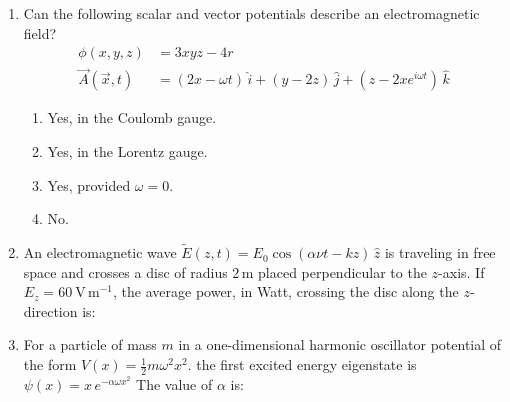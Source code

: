 \documentclass[journal,12pt,onecolumn]{IEEEtran}
\begin{document}
\begin{enumerate}[itemsep = 1em]
\hfill{}

\begin{enumerate}
\end{enumerate}

\item Can the following scalar and vector potentials describe an electromagnetic field?
\begin{align}
\phi(x,y,z) &= 3xyz - 4r \\
\vec{A}(\vec{x},t)  &= (2x - \omega t) \, \hat{i} + (y - 2z) \, \hat{j} + (z-2xe^{i\omega t}) \, \hat{k}  
\end{align}

\hfill{}

\begin{enumerate}
\item Yes, in the Coulomb gauge.
\item Yes, in the Lorentz gauge.
\item Yes, provided $\omega = 0$.
\item No.
\end{enumerate}


\item An electromagnetic wave $\tilde{E}(z,t) = E_{0} \cos(\alpha \nu t - kz) \, \hat{z}$ is traveling in free space and crosses a disc of radius $2\,\text{m}$ placed perpendicular to the $z$-axis. If $E_{z} = 60 \ \mathrm{V \, m^{-1}}$, the average power, in Watt, crossing the disc along the $z$-direction is:

\hfill{}

\begin{enumerate}
\end{enumerate}

\item For a particle of mass $m$ in a one-dimensional harmonic oscillator potential of the form  $V(x) = \frac{1}{2} m \omega^{2} x^{2}$. the first excited energy eigenstate is  $\psi(x) = x \, e^{ -\alpha \omega x^{2} }$ The value of $\alpha$ is:


\end{enumerate}
\end{document}
